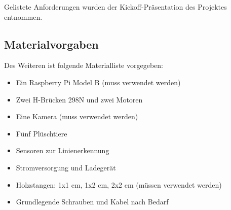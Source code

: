 Gelistete Anforderungen wurden der Kickoff-Präsentation des Projektes entnommen.

\subsection{Materialvorgaben}

Des Weiteren ist folgende Materialliste vorgegeben:

\begin{itemize}
    \item Ein Raspberry Pi Model B (muss verwendet werden)
    \item Zwei H-Brücken 298N und zwei Motoren
    \item Eine Kamera (muss verwendet werden)
    \item Fünf Plüschtiere
    \item Sensoren zur Linienerkennung
    \item Stromversorgung und Ladegerät
    \item Holzstangen: 1x1 cm, 1x2 cm, 2x2 cm (müssen verwendet werden)
    \item Grundlegende Schrauben und Kabel nach Bedarf
\end{itemize}

